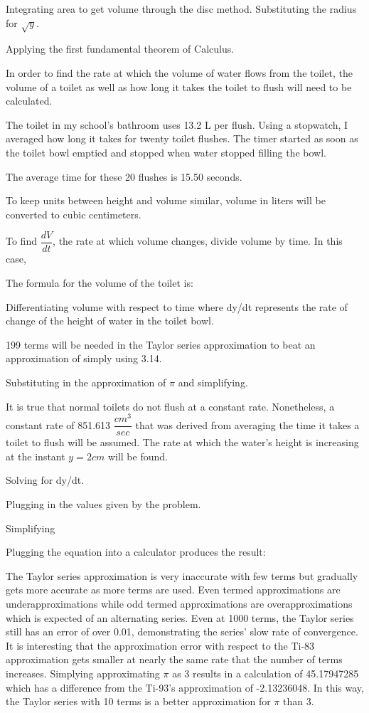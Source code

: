 Integrating area to get volume through the disc method.
Substituting the radius for \(\sqrt{y}\).

Applying the first fundamental theorem of Calculus.

In order to find the rate at which the volume of water flows from the toilet, the volume of a toilet as well as how long it takes the toilet to flush will need to be calculated. 

The toilet in my school's bathroom uses 13.2 L per flush. Using a stopwatch, I averaged how long it takes for twenty toilet flushes. The timer started as soon as the toilet bowl emptied and stopped when water stopped filling the bowl.


The average time for these 20 flushes is 15.50 seconds. 

To keep units between height and volume similar, volume in liters will be converted to cubic centimeters.

To find \(\dfrac{dV}{dt}\), the rate at which volume changes, divide volume by time. In this case,

The formula for the volume of the toilet is:

Differentiating volume with respect to time where dy/dt represents the rate of change of the height of water in the toilet bowl.

199 terms will be needed in the Taylor series approximation to beat an approximation of simply using 3.14.


Substituting in the approximation of \(\pi\) and simplifying.

It is true that normal toilets do not flush at a constant rate. Nonetheless,  a constant rate of 851.613 \(\dfrac{cm^{3}}{sec}\) that was derived from averaging the time it takes a toilet to flush will be assumed. The rate at which the water's height is increasing at the instant \(y = 2 cm\) will be found.

Solving for dy/dt.

Plugging in the values given by the problem.

Simplifying

Plugging the equation into a calculator produces the result:


The Taylor series approximation is very inaccurate with few terms but gradually gets more accurate as more terms are used. Even termed approximations are underapproximations while odd termed approximations are overapproximations which is expected of an alternating series. Even at 1000 terms, the Taylor series still has an error of over 0.01, demonstrating the series' slow rate of convergence. It is interesting that the approximation error with respect to the Ti-83 approximation gets smaller at nearly the same rate that the number of terms increases. Simplying approximating \(\pi\) as 3 results in a calculation of 45.17947285 which has a difference from the Ti-93's approximation of -2.13236048. In this way, the Taylor series with 10 terms is a better approximation for \(\pi\) than 3. 

